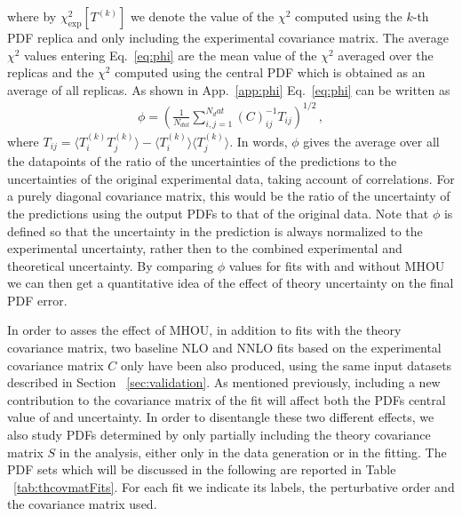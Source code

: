     where by $\chi^2_{\text{exp}}\left[T^{(k)}\right]$ we denote the value of the $\chi^2$
    computed using the $k$-th PDF replica and only including the experimental covariance matrix.
    The average $\chi^2$ values entering Eq.~\ref{eq:phi} are the mean value of the $\chi^2$ averaged over the replicas
    and the $\chi^2$ computed using the central PDF which is obtained as an average of all replicas. 
    As shown in App.~\ref{app:phi} Eq.~\eqref{eq:phi} can be written as
    \begin{align}
        \phi = \left(\frac{1}{N_{dat}}\sum_{i,j=1}^{N_dat} \left(C\right)^{-1}_{ij}T_{ij}\right)^{1/2}\,,
    \end{align}
    where $T_{ij} = \langle T^{(k)}_i T^{(k)}_j \rangle - \langle T^{(k)}_i \rangle \langle T^{(k)}_j \rangle$. In words,
    $\phi$ gives the average over all the datapoints of the ratio of the uncertainties of the predictions
    to the uncertainties of the original experimental data, taking account of correlations. For a purely diagonal
    covariance matrix, this would be the ratio of the uncertainty of the predictions using the output PDFs
    to that of the original data. Note that  $\phi$ is defined so that the uncertainty in the prediction is always
    normalized to the experimental uncertainty, rather then to the combined experimental and theoretical uncertainty.
    By comparing $\phi$ values for fits with and without MHOU we can then get a quantitative idea of the effect of theory
    uncertainty on the final PDF error.

    In order to asses the effect of MHOU, in addition to fits with the theory covariance matrix, two baseline
    NLO and NNLO fits based on the experimental covariance matrix $C$ only have been also produced, 
    using the same input datasets described in Section ~\ref{sec:validation}. 
    As mentioned previously, including a new contribution to the covariance matrix of the fit
    will affect both the PDFs central value of and uncertainty. In order to disentangle these
    two different effects, we also study PDFs determined by only partially 
    including the theory covariance matrix $S$ in the analysis, either only in the data generation or in the fitting. 
    The PDF sets which will be discussed in the following are reported in Table ~\ref{tab:thcovmatFits}. 
    For each fit we indicate its labels, the perturbative order and the covariance matrix used.
    

